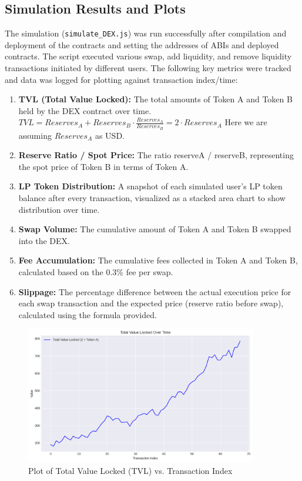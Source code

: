 \documentclass[12pt]{article}
\begin{document}
\subsection{Simulation Results and Plots}
The simulation (\texttt{simulate\_DEX.js}) was run successfully after compilation and deployment of the contracts and setting the addresses of ABIs and deployed contracts. The script executed various swap, add liquidity, and remove liquidity transactions initiated by different users.
The following key metrics were tracked and data was logged for plotting against transaction index/time:
\begin{enumerate}
    \item \textbf{TVL (Total Value Locked):} The total amounts of Token A and Token B held by the DEX contract over time. \(TVL = Reserves_A + Reserves_B \cdot \frac{Reserves_A}{Reserves_B} = 2 \cdot Reserves_A\) Here we are assuming \(Reserves_A\) as USD.
    \item \textbf{Reserve Ratio / Spot Price:} The ratio reserveA / reserveB, representing the spot price of Token B in terms of Token A.
    \item \textbf{LP Token Distribution:} A snapshot of each simulated user's LP token balance after every transaction, visualized as a stacked area chart to show distribution over time.
    \item \textbf{Swap Volume:} The cumulative amount of Token A and Token B swapped into the DEX.
    \item \textbf{Fee Accumulation:} The cumulative fees collected in Token A and Token B, calculated based on the 0.3\% fee per swap.
    \item \textbf{Slippage:} The percentage difference between the actual execution price for each swap transaction and the expected price (reserve ratio before swap), calculated using the formula provided.
\end{enumerate}
\begin{figure}[H]
    \centering
    \includegraphics[width=0.9\textwidth]{../task2_plots/total_value_locked.png}
    \caption{Plot of Total Value Locked (TVL) vs. Transaction Index}
    \label{fig:reserves}
\end{figure}
\end{document}
